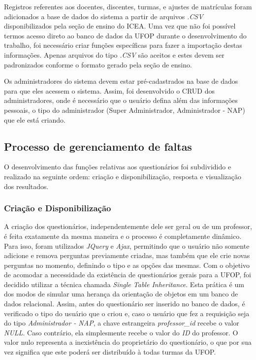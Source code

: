 \documentclass[
  12pt,       %
  openright,      %
  oneside,      %
  a4paper,      %
  english,      %
  french,        %
  spanish,     %
  brazil        %
  ]{abntex2-decsi}
\begin{document}
    Registros referentes aos docentes, discentes, turmas, e ajustes de matrículas foram adicionados a base de dados do sistema a partir de arquivos \textit{.CSV} disponibilizados pela seção de ensino do ICEA. Uma vez que não foi possível termos acesso direto ao banco de dados da UFOP durante o desenvolvimento do trabalho, foi necessário criar funções específicas para fazer a importação destas informações. Apenas arquivos do tipo \textit{.CSV} são aceitos e estes devem ser padronizados conforme o formato gerado pela seção de ensino.

    Os administradores do sistema devem estar pré-cadastrados na base de dados para que eles acessem o sistema. Assim, foi desenvolvido o CRUD dos administradores, onde é necessário que o usuário defina além das informações pessoais, o tipo do administrador (Super Administrador, Administrador - NAP) que ele está criando. 

        \subsection{Processo de gerenciamento de faltas}

    	O desenvolvimento das funções relativas aos questionários foi subdividido e realizado na seguinte ordem: criação e disponibilização, resposta e visualização dos resultados.

            \subsubsection{Criação e Disponibilização}

            A criação dos questionários, independentemente dele ser geral ou de um professor, é feita exatamente da mesma maneira e o processo é completamente dinâmico. Para isso, foram utilizados \textit{JQuery} e \textit{Ajax}, permitindo que o usuário não somente adicione e remova perguntas previamente criadas, mas também que ele crie novas perguntas no momento, definindo o tipo e as opções das mesmas. Com o objetivo de acomodar a necessidade da existência de questionários gerais para a UFOP, foi decidido utilizar a técnica chamada \textit{Single Table Inheritance}. Esta prática é um dos modos de simular uma herança da orientação de objetos em um banco de dados relacional. Assim, antes do questionário ser inserido no banco de dados, é verificado o tipo do usuário que o criou e, caso o usuário que fez a requisição seja do tipo \textit{Administrador - NAP}, a chave estrangeira \textit{professor\_id} recebe o valor \textit{NULL}. Caso contrário, ela simplesmente recebe o valor do \textit{ID} do professor. O valor nulo representa a inexistência do proprietário do questionário, o que por sua vez significa que este poderá ser distribuído à todas turmas da UFOP.
\end{document}
